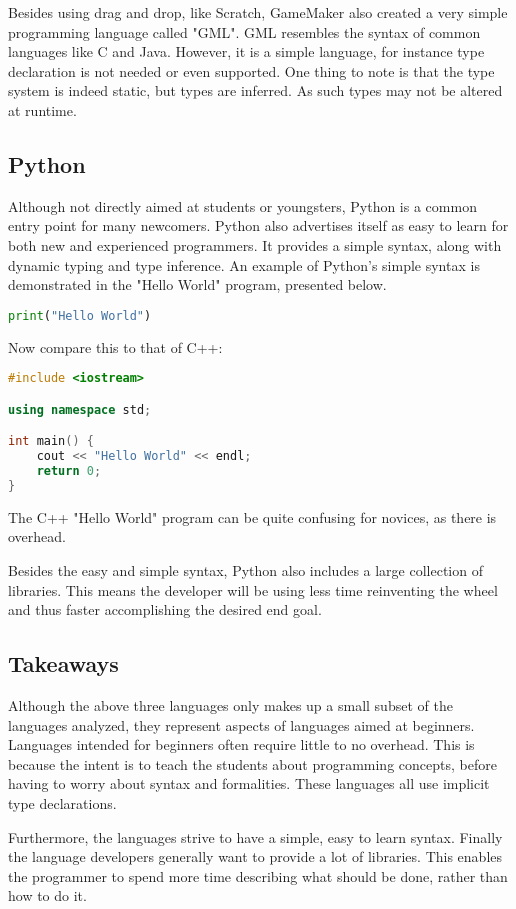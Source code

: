 Besides using drag and drop, like Scratch, GameMaker also created a very simple programming language called "GML".
GML resembles the syntax of common languages like C and Java. 
However, it is a simple language, for instance type declaration is not needed or even supported.
One thing to note is that the type system is indeed static, but types are inferred. 
As such types may not be altered at runtime\cite{GML}.

\subsection{Python}
Although not directly aimed at students or youngsters, Python is a common entry point for many newcomers. 
Python also advertises itself as easy to learn for both new and experienced programmers. 
It provides a simple syntax, along with dynamic typing and type inference\cite{PythonWebsite}.
An example of Python's simple syntax is demonstrated in the "Hello World" program, presented below.

\begin{lstlisting}[language=Python,label=lis:PythonHelloWorld,caption=Hello World in python]
print("Hello World")
\end{lstlisting}

Now compare this to that of C++:

\begin{lstlisting}[language=C++,label=lis:C++HelloWorld,caption=Hello World in C++]
#include <iostream>

using namespace std;

int main() {
	cout << "Hello World" << endl;
	return 0;
}
\end{lstlisting}

The C++ "Hello World" program can be quite confusing for novices, as there is overhead.

Besides the easy and simple syntax, Python also includes a large collection of libraries\cite{PythonLibraries}.
This means the developer will be using less time reinventing the wheel and thus faster accomplishing the desired end goal\cite{PythonXKCD}.

\subsection{Takeaways}
Although the above three languages only makes up a small subset of the languages analyzed, they represent aspects of languages aimed at beginners.
Languages intended for beginners often require little to no overhead. 
This is because the intent is to teach the students about programming concepts, before having to worry about syntax and formalities. 
These languages all use implicit type declarations.

Furthermore, the languages strive to have a simple, easy to learn syntax. 
Finally the language developers generally want to provide a lot of libraries. 
This enables the programmer to spend more time describing what should be done, rather than how to do it.
